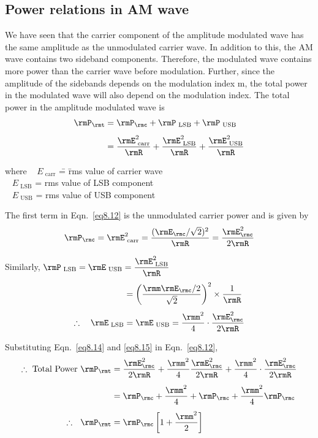 \subsection{Power relations in AM wave}\label{sec8.5.2}
We have seen that the carrier component of the amplitude modulated
wave has the same amplitude as the unmodulated carrier wave. In
addition to this, the AM wave contains two sideband
components. Therefore, the modulated wave contains more power than the
carrier wave before modulation. Further, since the amplitude of the
sidebands depends on the modulation index m, the total power in the
modulated wave will also depend on the modulation index. The total
power in the amplitude modulated wave is 
\begin{align}
\rmP_\rmt & = \rmP_\rmc + \rmP_{\text{ LSB}} + \rmP_{\text{ USB}} \label{eq8.12}\\[4pt]
& = \frac{\rmE^2_{\text{ carr}}}{\rmR} + \frac{\rmE^2_{\text{
LSB}}}{\rmR} + \frac{\rmE^2_{\text{ USB}}}{\rmR} \label{eq8.13}
\end{align}
\begin{tabbing}
\hspace{1cm} where ~ $E_{\text{ carr}}$ \= = \= rms value of carrier wave\\[3pt]
\hspace{2cm} ~ $E_{\text{~LSB}}$ \> = \> rms value of LSB component\\[3pt]
\hspace{2cm} ~ $E_{\text{~USB}}$ \> = \> rms value of USB component
\end{tabbing}

The first term in Eqn.~\eqref{eq8.12} is the unmodulated carrier power
and is given by
\begin{equation}
\rmP_\rmc = \rmE^2_{\text{ carr}} = \frac{(\rmE_\rmc/\sqrt{2})^2}{\rmR} = \frac{\rmE^2_\rmc}{2\rmR} \label{eq8.14}
\end{equation}

Similarly, $\rmP_{\text{ LSB}} = \rmE_{\text{ USB}} = \dfrac{{\rmE}^2_{\text{ LSB}}}{\rmR}$
\begin{align}
& = \left(\frac{\rmm \rmE_\rmc/2}{\sqrt{2}} \right)^2 \times \frac{1}{\rmR}\notag\\[4pt]
\therefore\quad  \rmE_{\text{ LSB}} & = \rmE_{\text{ USB}} = \frac{\rmm^2}{4} \cdot \frac{\rmE^2_\rmc}{2\rmR}\label{eq8.15}
\end{align}

Substituting Eqn.~\eqref{eq8.14} and \eqref{eq8.15} in Eqn.~\eqref{eq8.12},
\begin{align}
\therefore ~ \text{Total Power} ~  \rmP_\rmt  & = \frac{\rmE^2_\rmc}{2\rmR}
+ \frac{\rmm^2}{4} \frac{\rmE^2_\rmc}{2\rmR}
+ \frac{\rmm^2}{4} \cdot \frac{\rmE^2_\rmc}{2\rmR}\notag\\[4pt]
& = \rmP_\rmc + \frac{\rmm^2}{4} + \rmP_\rmc + \frac{\rmm^2}{4} \rmP_\rmc \notag\\[4pt]
\therefore ~~ \rmP_\rmt & = \rmP_\rmc \left[1 + \frac{\rmm^2}{2} \right]\label{eq8.16}
\end{align}

